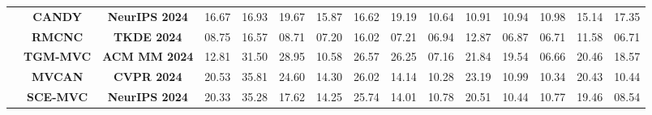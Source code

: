 \documentclass{article}
\theoremstyle{plain}
\theoremstyle{definition}
\theoremstyle{remark}
\begin{document}
\begin{table}[]
{\begin{tabular}{c|cc|ccc|ccc|ccc|ccc}
                            & \multicolumn{1}{c|}{\textbf{CANDY}}   & \textbf{NeurIPS 2024} & 16.67                                 & 16.93                                 & 19.67                                 & 15.87                                 & 16.62                                 & 19.19                                 & 10.64                                 & 10.91                                 & 10.94                                 & 10.98                                 & 15.14                                 & 17.35                                 \\
                            & \multicolumn{1}{c|}{\textbf{RMCNC}}   & \textbf{TKDE 2024}    & 08.75                                 & 16.57                                 & 08.71                                 & 07.20                                 & 16.02                                 & 07.21                                 & 06.94                                 & 12.87                                 & 06.87                                 & 06.71                                 & 11.58                                 & 06.71                                 \\
                            & \multicolumn{1}{c|}{\textbf{TGM-MVC}} & \textbf{ACM MM 2024}  & 12.81                                 & 31.50                                 & {\color[HTML]{3531FF} 28.95}          & 10.58                                 & {\color[HTML]{3531FF} 26.57}          & {\color[HTML]{3531FF} 26.25}          & 07.16                                 & 21.84                                 & {\color[HTML]{3531FF} 19.54}          & 06.66                                 & {\color[HTML]{3531FF} 20.46}          & {\color[HTML]{3531FF} 18.57}          \\
                            & \multicolumn{1}{c|}{\textbf{MVCAN}}   & \textbf{CVPR 2024}    & {\color[HTML]{3531FF} 20.53}          & {\color[HTML]{3531FF} 35.81}          & 24.60                                 & 14.30                                 & 26.02                                 & 14.14                                 & 10.28                                 & 23.19                                 & 10.99                                 & 10.34                                 & 20.43                                 & 10.44                                 \\
                            & \multicolumn{1}{c|}{\textbf{SCE-MVC}} & \textbf{NeurIPS 2024} & 20.33                                 & 35.28                                 & 17.62                                 & 14.25                                 & 25.74                                 & 14.01                                 & 10.78                                 & 20.51                                 & 10.44                                 & {\color[HTML]{3531FF} 10.77}          & 19.46                                 & 08.54                                 \\

\end{tabular}}
\end{table}
\end{document}
